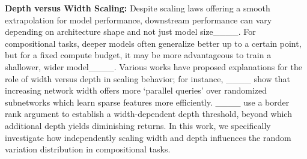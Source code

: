 \textbf{Depth versus Width Scaling:} Despite scaling laws offering a smooth extrapolation for model performance, downstream performance can vary depending on architecture shape and not just model size____. For compositional tasks, deeper models often generalize better up to a certain point, but for a fixed compute budget, it may be more advantageous to train a shallower, wider model____. Various works have proposed explanations for the role of width versus depth in scaling behavior; for instance, ____ show that increasing network width offers more `parallel queries' over randomized subnetworks which learn sparse features more efficiently.  ____ use a border rank argument to establish a width-dependent depth threshold, beyond which additional depth yields diminishing returns. In this work, we specifically investigate how independently scaling width and depth influences the random variation distribution in compositional tasks.